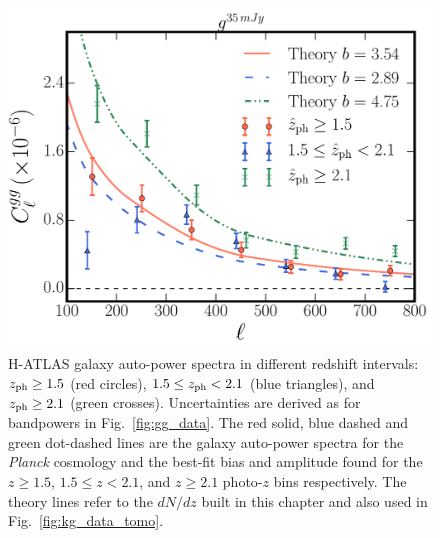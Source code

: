 \begin{figure} %
\centering %
\includegraphics[width=\textwidth]{Chapter4/Images/gg_ALL_2015_zbins_allcomparisons}
\caption{H-ATLAS galaxy auto-power spectra in different redshift intervals: $z_{\rm{ph}} \ge 1.5$ (red circles), $1.5 \le z_{\rm{ph}} < 2.1$
(blue triangles), and $z_{\rm{ph}}\ge 2.1$ (green crosses). Uncertainties are derived as for bandpowers in Fig.~\eqref{fig:gg_data}. The red solid, blue dashed and green dot-dashed lines are the galaxy auto-power spectra for the \emph{Planck} cosmology and the best-fit bias and amplitude found for the $z \ge 1.5$, $1.5 \le z < 2.1$, and $z \ge 2.1$ photo-$z$ bins respectively. The theory lines refer to the $dN/dz$ built in this chapter and also used in Fig.~\eqref{fig:kg_data_tomo}. \label{fig:gg_data_tomo}}
\end{figure}

